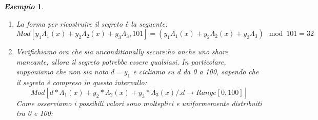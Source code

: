 \documentclass{book}
\newtheorem*{Importante}{\textbf{\textcolor{red}{Importante}}}
\newtheorem{esempio}{\emph{Esempio}}
\begin{document}
\begin{esempio}
\begin{enumerate}
		      \begin{equation*}
			      \begin{matrix}
				      \Lambda_{1}(x)= Mod[(0-x{2})*(0-x_{4})*PowerMod[(x_{1}-x{2})*(x_{1}-x{4}),-1,101],101]=63 \\
				      \Lambda_{2}(x)= Mod[(0-x{1})*(0-x_{4})*PowerMod[(x_{2}-x{1})*(x_{2}-x{4}),-1,101],101]=49 \\
				      \Lambda_{4}(x)= Mod[(0-x{1})*(0-x_{2})*PowerMod[(x_{4}-x{1})*(x_{4}-x{2}),-1,101],101]=91
			      \end{matrix}
		      \end{equation*}
		      \begin{Importante}
			      \begin{equation*}
				      \centering
				      \Lambda_{i}(x)=\prod_{m=1,m\neq1}^{l}{\frac{x-x_{m}}{x_{i}-x_{m}}}\quad \Lambda_{i}(x_{i})=1;\quad \Lambda_{i}(x_{m})=0\quad for\ m\neq i
			      \end{equation*}
			      Questa formula imporrebbe di scrivere il denominatore sotto il segno di frazione, ma questo non è possibile se si effettua il modulo\@. Quindi, quello che occorre fare è effettuare l'inversa del modulo: in mathematica si utilizza PowerMod. Per esempio per \(\Lambda_{1}(0)\):
			      \begin{equation*}
				      \Lambda_{1}(x)= Mod[(0-x{2})*(0-x_{4})*PowerMod[(x_{1}-x{2})*(x_{1}-x{4}),-1,101],101]=(\frac{(0-x{2})*(0-x_{4})}{(x_{1}-x{2})*(x_{1}-x{4})})\mod{p}
			      \end{equation*}
			      In cui:
			      \begin{equation*}
				      \frac{1}{(x_{1}-x_{2})*(x_{1}-x_{4})}\mod{101}=
				      {((x_{1}-x_{2})(x_{1}-x{4}))}^{-1}\mod{101}
			      \end{equation*}
		      \end{Importante}
		\item La forma per ricostruire il segreto è la seguente:
		      \begin{equation*}
			      Mod[y_{1}\Lambda_{1}(x)+y_{2}\Lambda_{2}(x)+y_{3}\Lambda_{3},101]=(y_{1}\Lambda_{1}(x)+y_{2}\Lambda_{2}(x)+y_{3}\Lambda_{3})\mod{101}=32
		      \end{equation*}
		\item Verifichiamo ora che sia unconditionally secure: ho anche uno share mancante, allora il segreto potrebbe essere qualsiasi\@. In particolare, supponiamo che non sia noto \(d=y_{1}\) e cicliamo su d da 0 a 100, sapendo che il segreto è compreso in questo intervallo:
		      \begin{equation*}
			      Mod[d*\Lambda_{1}(x)+y_{2}*\Lambda_{2}(x)+y_{3}*\Lambda_{3}(x)/.{d\rightarrow Range[0,100]}]
		      \end{equation*}
		      Come osserviamo i possibili valori sono molteplici e uniformemente distribuiti tra 0 e 100:
	\end{enumerate}
\end{esempio}
\end{document}
